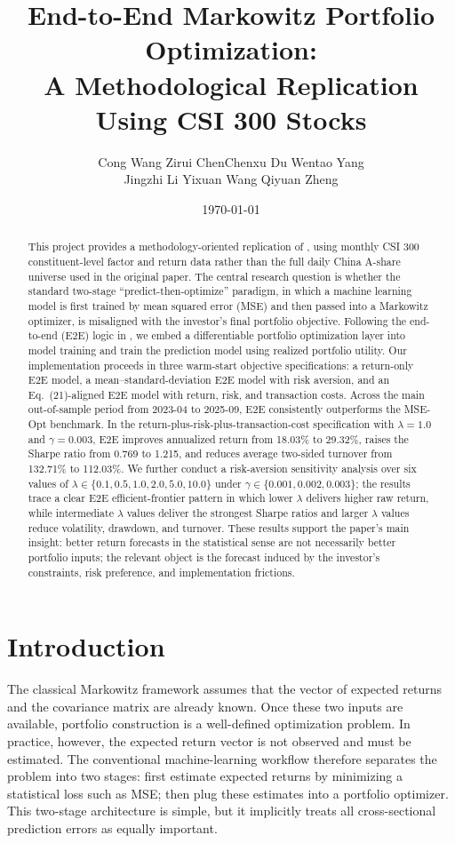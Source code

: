 \documentclass[11pt]{article}
\title{\textbf{End-to-End Markowitz Portfolio Optimization:\\
A Methodological Replication Using CSI 300 Stocks}}
\author{
Cong Wang \quad Zirui Chen\quad Chenxu Du \quad Wentao Yang\\
Jingzhi Li \quad Yixuan Wang \quad Qiyuan Zheng
}
\date{\today}
\begin{document}
\maketitle

\begin{abstract}
This project provides a methodology-oriented replication of \citet{wang2026mlmm}, using monthly CSI 300 constituent-level factor and return data rather than the full daily China A-share universe used in the original paper. The central research question is whether the standard two-stage ``predict-then-optimize'' paradigm, in which a machine learning model is first trained by mean squared error (MSE) and then passed into a Markowitz optimizer, is misaligned with the investor's final portfolio objective. Following the end-to-end (E2E) logic in \citet{wang2026mlmm}, we embed a differentiable portfolio optimization layer into model training and train the prediction model using realized portfolio utility. Our implementation proceeds in three warm-start objective specifications: a return-only E2E model, a mean--standard-deviation E2E model with risk aversion, and an Eq.~(21)-aligned E2E model with return, risk, and transaction costs. Across the main out-of-sample period from 2023-04 to 2025-09, E2E consistently outperforms the MSE-Opt benchmark. In the return-plus-risk-plus-transaction-cost specification with $\lambda=1.0$ and $\gamma=0.003$, E2E improves annualized return from 18.03\% to 29.32\%, raises the Sharpe ratio from 0.769 to 1.215, and reduces average two-sided turnover from 132.71\% to 112.03\%. We further conduct a risk-aversion sensitivity analysis over six values of $\lambda\in\{0.1,0.5,1.0,2.0,5.0,10.0\}$ under $\gamma\in\{0.001,0.002,0.003\}$; the results trace a clear E2E efficient-frontier pattern in which lower $\lambda$ delivers higher raw return, while intermediate $\lambda$ values deliver the strongest Sharpe ratios and larger $\lambda$ values reduce volatility, drawdown, and turnover. These results support the paper's main insight: better return forecasts in the statistical sense are not necessarily better portfolio inputs; the relevant object is the forecast induced by the investor's constraints, risk preference, and implementation frictions.
\end{abstract}

\section{Introduction}

The classical Markowitz framework assumes that the vector of expected returns and the covariance matrix are already known. Once these two inputs are available, portfolio construction is a well-defined optimization problem. In practice, however, the expected return vector is not observed and must be estimated. The conventional machine-learning workflow therefore separates the problem into two stages: first estimate expected returns by minimizing a statistical loss such as MSE; then plug these estimates into a portfolio optimizer. This two-stage architecture is simple, but it implicitly treats all cross-sectional prediction errors as equally important.
\end{document}
